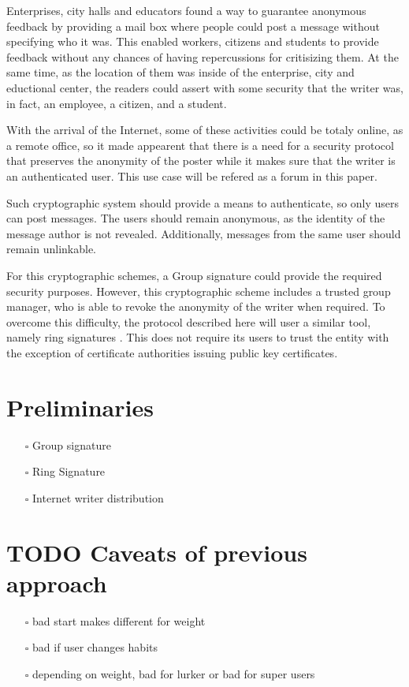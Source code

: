 \documentclass[11pt]{article}
\begin{document}
Enterprises, city halls and educators found a way to guarantee anonymous feedback by providing a mail box
where people could post a message without specifying who it was. This enabled workers, citizens and students
to provide feedback without any chances of having repercussions for critisizing them. At the same time, as the location of them was inside of the enterprise, city and eductional center, the readers could assert with some
security that the writer was, in fact, an employee, a citizen, and a student.

With the arrival of the Internet, some of these activities could be totaly online, as a remote
office, so it made appearent that there is a need for a security protocol that preserves the
anonymity of the poster while it makes sure that the writer is an authenticated user. This use case
will be refered as a forum in this paper.

Such cryptographic system should provide a means to authenticate, so only users can post messages. The users
should remain anonymous, as the identity of the message author is not revealed. Additionally, messages from the same user should remain unlinkable.

For this cryptographic schemes, a Group signature \cite{group} could provide the required security purposes. However, this cryptographic scheme includes a trusted group manager, who is able to revoke the anonymity of the writer when required. To overcome this difficulty, the protocol described here will user a similar tool, namely ring signatures \cite{ring}. This does not require its users to trust the entity with the exception of
certificate authorities issuing public key certificates.

\section{Preliminaries}
\label{sec:org9952df9}
\begin{itemize}
\item[{$\square$}] Group signature
\item[{$\square$}] Ring Signature
\item[{$\square$}] Internet writer distribution
\end{itemize}

\section{{\bfseries\sffamily TODO} Caveats of previous approach}
\label{sec:org17fe0d9}
\begin{itemize}
\item[{$\square$}] bad start makes different for weight
\item[{$\square$}] bad if user changes habits
\item[{$\square$}] depending on weight, bad for lurker or bad for super users
\end{itemize}
\end{document}
